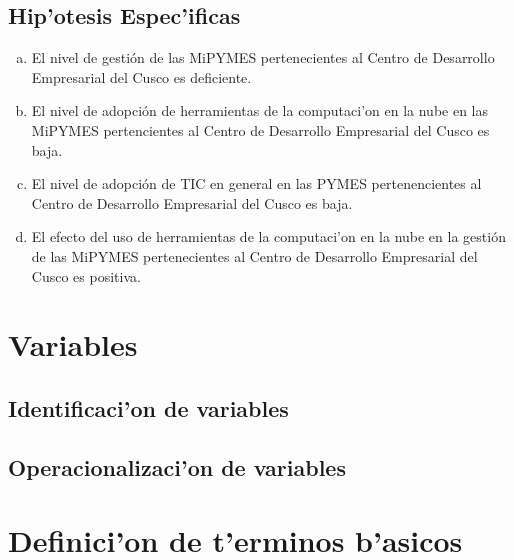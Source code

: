 \subsection{Hip'otesis Espec'ificas}
\begin{enumerate}[a.]
    \item El nivel de gesti\'on de las MiPYMES pertenecientes al Centro de Desarrollo
          Empresarial del Cusco es deficiente.
    \item El nivel de adopci\'on de herramientas de la computaci'on en la nube en las
          MiPYMES pertencientes al Centro de Desarrollo Empresarial del Cusco es baja.
    \item El nivel de adopci\'on de TIC en general en las PYMES pertenencientes al
          Centro de Desarrollo Empresarial del Cusco es baja.
    \item El efecto del uso de herramientas de la computaci'on en la nube en la
          gesti\'on de las MiPYMES pertenecientes al Centro de Desarrollo Empresarial
          del Cusco es positiva.
\end{enumerate}

\section{Variables}

\subsection{Identificaci'on de variables}

\subsection{Operacionalizaci'on de variables}

\section{Definici'on de t'erminos b'asicos}

